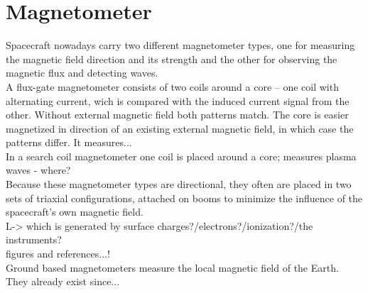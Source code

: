 

\section{Magnetometer}

Spacecraft nowadays carry two different magnetometer types, one for measuring the magnetic field direction and its strength and the other for observing the magnetic flux and detecting waves.\\

A flux-gate magnetometer consists of two coils around a core -- one coil with alternating current, wich is compared with the induced current signal from the other. Without external magnetic field both patterns match. The core is easier magnetized in direction of an existing external magnetic field, in which case the patterns differ. It measures...\\
In a search coil magnetometer one coil is placed around a core; measures plasma waves - where?\\

Because these magnetometer types are directional, they often are placed in two sets of triaxial configurations, attached on booms to minimize the influence of the spacecraft's own magnetic field.\\
L-> which is generated by surface charges?/electrons?/ionization?/the instruments?\\

figures and references...!\\

Ground based magnetometers measure the local magnetic field of the Earth. They already exist since...\\

